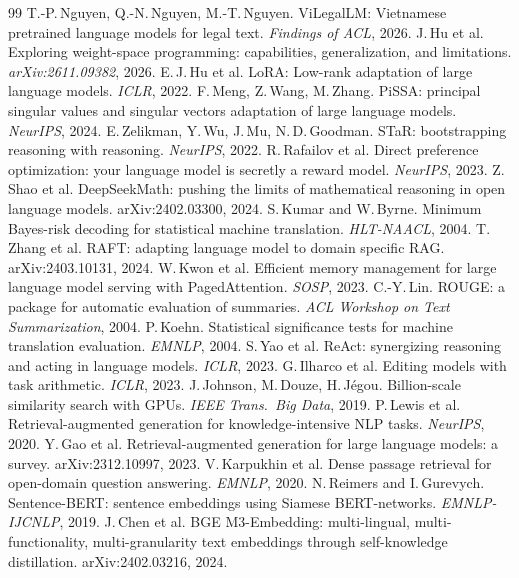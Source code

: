 \documentclass[11pt,a4paper]{article}
\begin{document}
\begin{thebibliography}{99}\small
{} T.-P.\,Nguyen, Q.-N.\,Nguyen, M.-T.\,Nguyen. ViLegalLM: Vietnamese pretrained language models for legal text. \textit{Findings of ACL}, 2026.
 J.\,Hu et al. Exploring weight-space programming: capabilities, generalization, and limitations. \textit{arXiv:2611.09382}, 2026.
 E.\,J.\,Hu et al. LoRA: Low-rank adaptation of large language models. \textit{ICLR}, 2022.
 F.\,Meng, Z.\,Wang, M.\,Zhang. PiSSA: principal singular values and singular vectors adaptation of large language models. \textit{NeurIPS}, 2024.
 E.\,Zelikman, Y.\,Wu, J.\,Mu, N.\,D.\,Goodman. STaR: bootstrapping reasoning with reasoning. \textit{NeurIPS}, 2022.
 R.\,Rafailov et al. Direct preference optimization: your language model is secretly a reward model. \textit{NeurIPS}, 2023.
 Z.\,Shao et al. DeepSeekMath: pushing the limits of mathematical reasoning in open language models. arXiv:2402.03300, 2024.
 S.\,Kumar and W.\,Byrne. Minimum Bayes-risk decoding for statistical machine translation. \textit{HLT-NAACL}, 2004.
 T.\,Zhang et al. RAFT: adapting language model to domain specific RAG. arXiv:2403.10131, 2024.
 W.\,Kwon et al. Efficient memory management for large language model serving with PagedAttention. \textit{SOSP}, 2023.
 C.-Y.\,Lin. ROUGE: a package for automatic evaluation of summaries. \textit{ACL Workshop on Text Summarization}, 2004.
 P.\,Koehn. Statistical significance tests for machine translation evaluation. \textit{EMNLP}, 2004.
 S.\,Yao et al. ReAct: synergizing reasoning and acting in language models. \textit{ICLR}, 2023.
 G.\,Ilharco et al. Editing models with task arithmetic. \textit{ICLR}, 2023.
 J.\,Johnson, M.\,Douze, H.\,J\'egou. Billion-scale similarity search with GPUs. \textit{IEEE Trans.\ Big Data}, 2019.
 P.\,Lewis et al. Retrieval-augmented generation for knowledge-intensive NLP tasks. \textit{NeurIPS}, 2020.
 Y.\,Gao et al. Retrieval-augmented generation for large language models: a survey. arXiv:2312.10997, 2023.
 V.\,Karpukhin et al. Dense passage retrieval for open-domain question answering. \textit{EMNLP}, 2020.
 N.\,Reimers and I.\,Gurevych. Sentence-BERT: sentence embeddings using Siamese BERT-networks. \textit{EMNLP-IJCNLP}, 2019.
 J.\,Chen et al. BGE M3-Embedding: multi-lingual, multi-functionality, multi-granularity text embeddings through self-knowledge distillation. arXiv:2402.03216, 2024.

\end{thebibliography}
\end{document}
